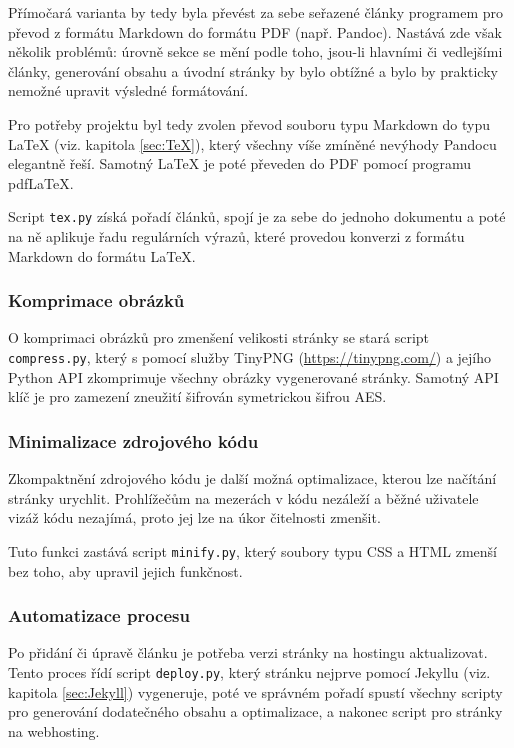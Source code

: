 \documentclass[a4paper, 12pt]{article}
\begin{document}
  Přímočará varianta by tedy byla převést za sebe seřazené články programem pro převod z formátu Markdown do formátu PDF (např. Pandoc). Nastává zde však několik problémů: úrovně sekce se mění podle toho, jsou-li hlavními či vedlejšími články, generování obsahu a úvodní stránky by bylo obtížné a bylo by prakticky nemožné upravit výsledné formátování.

  Pro potřeby projektu byl tedy zvolen převod souboru typu Markdown do typu \LaTeX{} (viz. kapitola \ref{sec:TeX}), který všechny víše zmíněné nevýhody Pandocu elegantně řeší. Samotný \LaTeX{} je poté převeden do PDF pomocí programu pdf\LaTeX.

  Script \texttt{tex.py} získá pořadí článků, spojí je za sebe do jednoho dokumentu a poté na ně aplikuje řadu regulárních výrazů, které provedou konverzi z formátu Markdown do formátu \LaTeX.


  \subsubsection{Komprimace obrázků}
  O komprimaci obrázků pro zmenšení velikosti stránky se stará script \texttt{compress.py}, který s pomocí služby TinyPNG (\url{https://tinypng.com/}) a jejího Python API zkomprimuje všechny obrázky vygenerované stránky. Samotný API klíč je pro zamezení zneužití šifrován symetrickou šifrou AES.


  \subsubsection{Minimalizace zdrojového kódu}
  Zkompaktnění zdrojového kódu je další možná optimalizace, kterou lze načítání stránky urychlit. Prohlížečům na mezerách v kódu nezáleží a běžné uživatele vizáž kódu nezajímá, proto jej lze na úkor čitelnosti zmenšit.

  Tuto funkci zastává script \texttt{minify.py}, který soubory typu CSS a HTML zmenší bez toho, aby upravil jejich funkčnost.


  \subsubsection{Automatizace procesu}
  Po přidání či úpravě článku je potřeba verzi stránky na hostingu aktualizovat. Tento proces řídí script \texttt{deploy.py}, který stránku nejprve pomocí Jekyllu (viz. kapitola \ref{sec:Jekyll}) vygeneruje, poté ve správném pořadí spustí všechny scripty pro generování dodatečného obsahu a optimalizace, a nakonec script pro stránky na webhosting.
\end{document}
